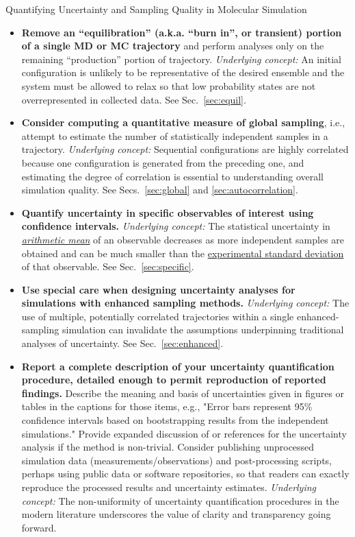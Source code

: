 \begin{Checklists*}[p!]
\begin{checklist}{Quantifying Uncertainty and Sampling Quality in Molecular Simulation}
\begin{itemize}
\item
  \textbf{Remove an ``equilibration'' (a.k.a. ``burn in'', or transient) portion of a single MD or MC trajectory} and perform analyses only on the remaining ``production'' portion of trajectory.
  \emph{Underlying concept:} An initial configuration is unlikely to be representative of the desired ensemble and the system must be allowed to relax so that low probability states are not overrepresented in collected data.  See Sec.\ \ref{sec:equil}.
 
\item
  \textbf{Consider computing a quantitative measure of global sampling}, i.e., attempt to estimate the number of statistically independent samples in a trajectory.
  \emph{Underlying concept:} Sequential configurations are highly correlated because one configuration is generated from the preceding one, and estimating the degree of correlation is essential to understanding overall simulation quality.
  See Secs.\ \ref{sec:global} and \ref{sec:autocorrelation}.

\item
  \textbf{Quantify uncertainty in specific observables of interest using confidence intervals.}
  \emph{Underlying concept:} The statistical uncertainty in \hyperref[def:arith_mean]{\emph{arithmetic mean}} of an observable decreases as more independent samples are obtained and can be much smaller than the \hyperref[def:exp_st_dev]{experimental standard deviation} of that observable.
  See Sec.\ \ref{sec:specific}.
 
\item
  \textbf{Use special care when designing uncertainty analyses for simulations with enhanced sampling methods.}
  \emph{Underlying concept:} The use of multiple, potentially correlated trajectories within a single enhanced-sampling simulation can invalidate the assumptions underpinning traditional analyses of uncertainty.
  See Sec.\ \ref{sec:enhanced}.

\item
\textbf{Report a complete description of your uncertainty quantification procedure, detailed enough to permit reproduction of reported findings.}
Describe the meaning and basis of uncertainties given in figures or tables in the captions for those items, e.g., "Error bars represent 95\% confidence intervals based on bootstrapping results from the independent simulations."
Provide expanded discussion of or references for the uncertainty analysis if the method is non-trivial.
Consider publishing unprocessed simulation data (measurements/observations) and post-processing scripts, perhaps using public data or software repositories, so that readers can exactly reproduce the processed results and uncertainty estimates.
\emph{Underlying concept:} The non-uniformity of uncertainty quantification procedures in the modern literature underscores the value of clarity and transparency going forward.

\end{itemize}
\end{checklist}
\end{Checklists*}
